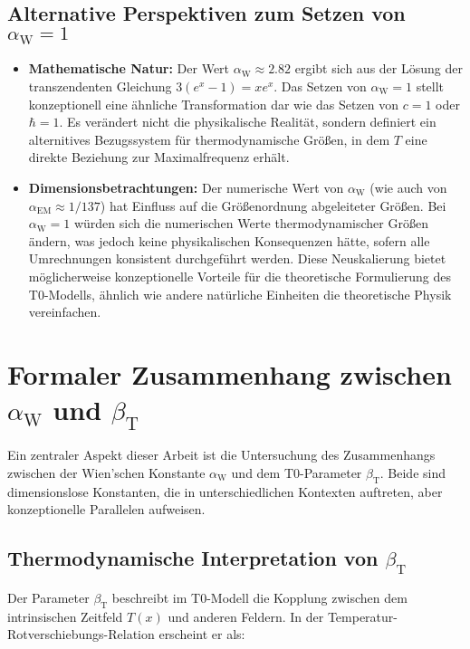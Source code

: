 \documentclass[12pt,a4paper]{article}
\newcommand{\Tfield}{T(x)}
\newcommand{\alphaEM}{\alpha_{\text{EM}}}
\newcommand{\betaT}{\beta_{\text{T}}}
\newcommand{\alphaW}{\alpha_{\text{W}}}
\begin{document}
	\subsection{Alternative Perspektiven zum Setzen von \(\alphaW = 1\)}
	
	\begin{itemize}
		\item \textbf{Mathematische Natur:} Der Wert \(\alphaW \approx 2.82\) ergibt sich aus der Lösung der transzendenten Gleichung \(3(e^x - 1) = xe^x\). Das Setzen von \(\alphaW = 1\) stellt konzeptionell eine ähnliche Transformation dar wie das Setzen von \(c = 1\) oder \(\hbar = 1\). Es verändert nicht die physikalische Realität, sondern definiert ein alternitives Bezugssystem für thermodynamische Größen, in dem \(T\) eine direkte Beziehung zur Maximalfrequenz erhält.
		
		\item \textbf{Dimensionsbetrachtungen:} Der numerische Wert von \(\alphaW\) (wie auch von \(\alphaEM \approx 1/137\)) hat Einfluss auf die Größenordnung abgeleiteter Größen. Bei \(\alphaW = 1\) würden sich die numerischen Werte thermodynamischer Größen ändern, was jedoch keine physikalischen Konsequenzen hätte, sofern alle Umrechnungen konsistent durchgeführt werden. Diese Neuskalierung bietet möglicherweise konzeptionelle Vorteile für die theoretische Formulierung des T0-Modells, ähnlich wie andere natürliche Einheiten die theoretische Physik vereinfachen.
	\end{itemize}
	
	\section{Formaler Zusammenhang zwischen \(\alphaW\) und \(\betaT\)}
	
	Ein zentraler Aspekt dieser Arbeit ist die Untersuchung des Zusammenhangs zwischen der Wien'schen Konstante \(\alphaW\) und dem T0-Parameter \(\betaT\). Beide sind dimensionslose Konstanten, die in unterschiedlichen Kontexten auftreten, aber konzeptionelle Parallelen aufweisen.
	
	\subsection{Thermodynamische Interpretation von \(\betaT\)}
	
	Der Parameter \(\betaT\) beschreibt im T0-Modell die Kopplung zwischen dem intrinsischen Zeitfeld \(\Tfield\) und anderen Feldern. In der Temperatur-Rotverschiebungs-Relation erscheint er als:
	
\end{document}
